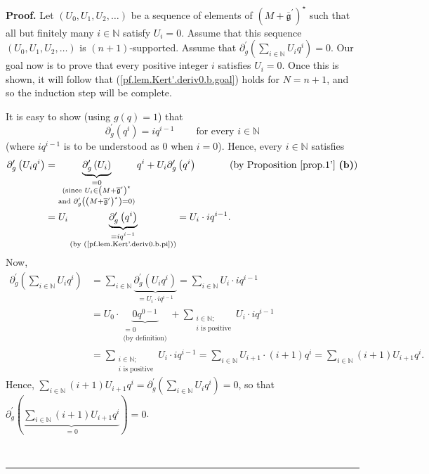 \documentclass[numbers=enddot,12pt,final,onecolumn,notitlepage]{scrartcl}%
\theoremstyle{definition}
\newenvironment{proof}[1][Proof]{\noindent\textbf{#1.} }{\ \rule{0.5em}{0.5em}}
\let\sumnonlimits\sum
\renewcommand{\sum}{\sumnonlimits\limits}
\begin{document}
\begin{proof}
Let $\left(  U_{0},U_{1},U_{2},\ldots\right)  $ be a sequence of elements of
$\left(  M+\overline{\mathfrak{g}}^{\prime}\right)  ^{\star}$ such that all
but finitely many $i\in\mathbb{N}$ satisfy $U_{i}=0$. Assume that this
sequence $\left(  U_{0},U_{1},U_{2},\ldots\right)  $ is $\left(  n+1\right)
$-supported. Assume that $\partial_{g}^{\prime}\left(  \sum_{i\in\mathbb{N}%
}U_{i}q^{i}\right)  =0$. Our goal now is to prove that every positive integer
$i$ satisfies $U_{i}=0$. Once this is shown, it will follow that
(\ref{pf.lem.Kert'.deriv0.b.goal}) holds for $N=n+1$, and so the induction
step will be complete.

It is easy to show (using $g\left(  q\right)  =1$) that%
\begin{equation}
\partial_{g}^{\prime}\left(  q^{i}\right)  =iq^{i-1}%
\ \ \ \ \ \ \ \ \ \ \text{for every }i\in\mathbb{N}
\label{pf.lem.Kert'.deriv0.b.pi}%
\end{equation}
(where $iq^{i-1}$ is to be understood as $0$ when $i=0$). Hence, every
$i\in\mathbb{N}$ satisfies
\begin{align*}
\partial_{g}^{\prime}\left(  U_{i}q^{i}\right)   &  =\underbrace{\partial
_{g}^{\prime}\left(  U_{i}\right)  }_{\substack{=0\\\text{(since }U_{i}%
\in\left(  M+\overline{\mathfrak{g}}^{\prime}\right)  ^{\star}\\\text{and
}\partial_{g}^{\prime}\left(  \left(  M+\overline{\mathfrak{g}}^{\prime
}\right)  ^{\star}\right)  =0\text{)}}}q^{i}+U_{i}\partial_{g}^{\prime}\left(
q^{i}\right)  \ \ \ \ \ \ \ \ \ \ \left(  \text{by Proposition \ref{prop.1'}
\textbf{(b)}}\right) \\
&  =U_{i}\underbrace{\partial_{g}^{\prime}\left(  q^{i}\right)  }%
_{\substack{=iq^{i-1}\\\text{(by (\ref{pf.lem.Kert'.deriv0.b.pi}))}}%
}=U_{i}\cdot iq^{i-1}.
\end{align*}
Now,%
\begin{align*}
\partial_{g}^{\prime}\left(  \sum_{i\in\mathbb{N}}U_{i}q^{i}\right)   &
=\sum_{i\in\mathbb{N}}\underbrace{\partial_{g}^{\prime}\left(  U_{i}%
q^{i}\right)  }_{=U_{i}\cdot iq^{i-1}}=\sum_{i\in\mathbb{N}}U_{i}\cdot
iq^{i-1}\\
&  =U_{0}\cdot\underbrace{0q^{0-1}}_{\substack{=0\\\text{(by definition)}%
}}+\sum_{\substack{i\in\mathbb{N};\\i\text{ is positive}}}U_{i}\cdot
iq^{i-1}\\
&  =\sum_{\substack{i\in\mathbb{N};\\i\text{ is positive}}}U_{i}\cdot
iq^{i-1}=\sum_{i\in\mathbb{N}}U_{i+1}\cdot\left(  i+1\right)  q^{i}=\sum
_{i\in\mathbb{N}}\left(  i+1\right)  U_{i+1}q^{i}.
\end{align*}
Hence, $\sum_{i\in\mathbb{N}}\left(  i+1\right)  U_{i+1}q^{i}=\partial
_{g}^{\prime}\left(  \sum_{i\in\mathbb{N}}U_{i}q^{i}\right)  =0$, so that
$\partial_{g}^{\prime}\left(  \underbrace{\sum_{i\in\mathbb{N}}\left(
i+1\right)  U_{i+1}q^{i}}_{=0}\right)  =0$.


\end{proof}
\end{document}
